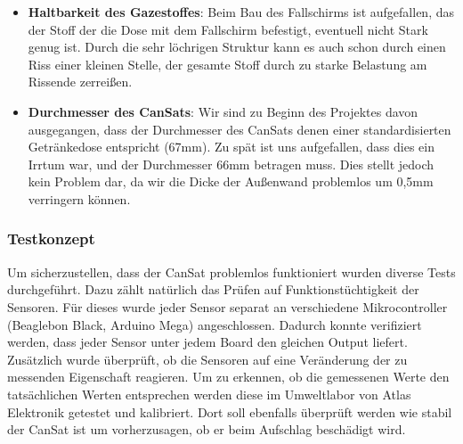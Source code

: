 \begin{itemize}
\item \textbf{Haltbarkeit des Gazestoffes}: Beim Bau des Fallschirms ist aufgefallen, das der Stoff der die Dose mit dem Fallschirm befestigt, eventuell nicht Stark genug ist. Durch die sehr löchrigen Struktur kann es auch schon durch einen Riss einer kleinen Stelle, der gesamte Stoff durch zu starke Belastung am Rissende zerreißen.
\item \textbf{Durchmesser des CanSats}: Wir sind zu Beginn des Projektes davon ausgegangen, dass der Durchmesser des CanSats denen einer standardisierten Getränkedose entspricht (67mm). Zu spät ist uns aufgefallen, dass dies ein Irrtum war, und der Durchmesser 66mm betragen muss. Dies stellt jedoch kein Problem dar, da wir die Dicke der Außenwand problemlos um 0,5mm verringern können.
\end{itemize}

\subsubsection{Testkonzept}

Um sicherzustellen, dass der CanSat problemlos funktioniert wurden diverse Tests durchgeführt. Dazu zählt natürlich das Prüfen auf Funktionstüchtigkeit der Sensoren. Für dieses wurde jeder Sensor separat an verschiedene Mikrocontroller (Beaglebon Black, Arduino Mega) angeschlossen. Dadurch konnte verifiziert werden, dass jeder Sensor unter jedem Board den gleichen Output liefert. Zusätzlich wurde überprüft, ob die Sensoren auf eine Veränderung der zu messenden Eigenschaft reagieren. Um zu erkennen, ob die gemessenen Werte den tatsächlichen Werten entsprechen werden diese im Umweltlabor von Atlas Elektronik getestet und kalibriert. Dort soll ebenfalls überprüft werden wie stabil der CanSat ist um vorherzusagen, ob er beim Aufschlag beschädigt wird.